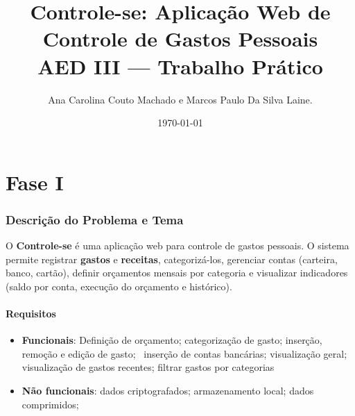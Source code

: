 \documentclass[12pt,a4paper]{article}
\title{Controle-se: Aplicação Web de Controle de Gastos Pessoais\\
\large AED III — Trabalho Prático}
\author{Ana Carolina Couto Machado e Marcos Paulo Da Silva Laine.}
\date{\today}
\begin{document}
\maketitle

\newpage
\part*{Fase I}

\section{Descrição do Problema e Tema}
O \textbf{Controle-se} é uma aplicação web para controle de gastos pessoais. O sistema permite
registrar \textbf{gastos} e \textbf{receitas}, categorizá-los, gerenciar contas (carteira, banco, cartão),
definir orçamentos mensais por categoria e visualizar indicadores (saldo por conta, execução do orçamento e histórico).

\subsection*{Requisitos}
\begin{itemize}
  \item \textbf{Funcionais}: Definição de orçamento; categorização de gasto; inserção, remoção e edição de gasto; \
  inserção de contas bancárias; visualização geral; visualização de gastos recentes; filtrar gastos por categorias
  \item \textbf{Não funcionais}: dados criptografados; armazenamento local; dados comprimidos;
\end{itemize}
\end{document}
